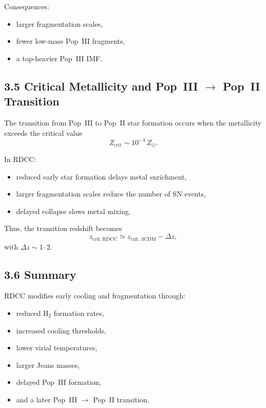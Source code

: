 \documentclass[11pt,a4paper]{article}
\begin{document}
Consequences:

\begin{itemize}
    \item larger fragmentation scales,
    \item fewer low-mass Pop~III fragments,
    \item a top-heavier Pop~III IMF.
\end{itemize}

\subsection*{3.5 Critical Metallicity and Pop~III $\rightarrow$ Pop~II Transition}

The transition from Pop~III to Pop~II star formation occurs when the metallicity exceeds the 
critical value
\begin{equation}
    Z_{\mathrm{crit}}
    \sim 10^{-4}\,Z_{\odot}.
\end{equation}

In RDCC:

\begin{itemize}
    \item reduced early star formation delays metal enrichment,
    \item larger fragmentation scales reduce the number of SN events,
    \item delayed collapse slows metal mixing.
\end{itemize}

Thus, the transition redshift becomes
\begin{equation}
    z_{\mathrm{crit,RDCC}}
    \simeq z_{\mathrm{crit},\Lambda\mathrm{CDM}} - \Delta z,
\end{equation}
with $\Delta z \sim 1$--$2$.

\subsection*{3.6 Summary}

RDCC modifies early cooling and fragmentation through:

\begin{itemize}
    \item reduced $\mathrm{H}_2$ formation rates,
    \item increased cooling thresholds,
    \item lower virial temperatures,
    \item larger Jeans masses,
    \item delayed Pop~III formation,
    \item and a later Pop~III $\rightarrow$ Pop~II transition.
\end{itemize}
\end{document}
